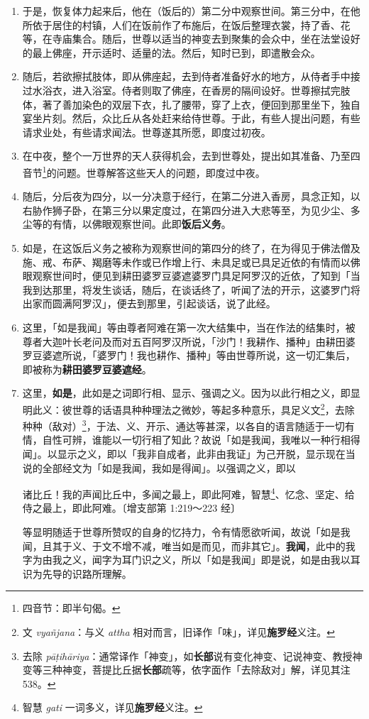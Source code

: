 \begin{enumerate}
\item 于是，恢复体力起来后，他在（饭后的）第二分中观察世间。第三分中，在他所依于居住的村镇，人们在饭前作了布施后，在饭后整理衣裳，持了香、花等，在寺庙集合。随后，世尊以适当的神变去到聚集的会众中，坐在法堂设好的最上佛座，开示适时、适量的法。然后，知时已到，即遣散会众。
\item 随后，若欲擦拭肢体，即从佛座起，去到侍者准备好水的地方，从侍者手中接过水浴衣，进入浴室。侍者则取了佛座，在香房的隔间设好。世尊擦拭完肢体，著了善加染色的双层下衣，扎了腰带，穿了上衣，便回到那里坐下，独自宴坐片刻。然后，众比丘从各处赶来给侍世尊。于此，有些人提出问题，有些请求业处，有些请求闻法。世尊遂其所愿，即度过初夜。
\item 在中夜，整个一万世界的天人获得机会，去到世尊处，提出如其准备、乃至四音节\footnote{四音节：即半句偈。}的问题。世尊解答这些天人的问题，即度过中夜。
\item 随后，分后夜为四分，以一分决意于经行，在第二分进入香房，具念正知，以右胁作狮子卧，在第三分以果定度过，在第四分进入大悲等至，为见少尘、多尘等的有情，以佛眼观察世间。此即\textbf{饭后义务}。
\item 如是，在这饭后义务之被称为观察世间的第四分的终了，在为得见于佛法僧及施、戒、布萨、羯磨等未作或已作增上行、未具足或已具足近依的有情而以佛眼观察世间时，便见到耕田婆罗豆婆遮婆罗门具足阿罗汉的近依，了知到「当我到达那里，将发生谈话，随后，在谈话终了，听闻了法的开示，这婆罗门将出家而圆满阿罗汉」，便去到那里，引起谈话，说了此经。
\item 这里，「如是我闻」等由尊者阿难在第一次大结集中，当在作法的结集时，被尊者大迦叶长老问及而对五百阿罗汉所说，「沙门！我耕作、播种」由耕田婆罗豆婆遮所说，「婆罗门！我也耕作、播种」等由世尊所说，这一切汇集后，即被称为\textbf{耕田婆罗豆婆遮经}。
\item 这里，\textbf{如是}，此如是之词即行相、显示、强调之义。因为以此行相之义，即显明此义：彼世尊的话语具种种理法之微妙，等起多种意乐，具足义文\footnote{文 \textit{vyañjana}：与义 \textit{attha} 相对而言，旧译作「味」，详见\textbf{施罗经}义注。}，去除种种（敌对）\footnote{去除 \textit{pāṭihāriya}：通常译作「神变」，如\textbf{长部}说有变化神变、记说神变、教授神变等三种神变，菩提比丘据\textbf{长部}疏等，依字面作「去除敌对」解，详见其注 538。}，于法、义、开示、通达等甚深，以各自的语言随适于一切有情，自性可辨，谁能以一切行相了知此？故说「如是我闻，我唯以一种行相得闻」。以显示之义，即以「我非自成者，此非由我证」为己开脱，显示现在当说的全部经文为「如是我闻，我如是得闻」。以强调之义，即以\begin{quoting}诸比丘！我的声闻比丘中，多闻之最上，即此阿难，智慧\footnote{智慧 \textit{gati} 一词多义，详见\textbf{施罗经}义注。}、忆念、坚定、给侍之最上，即此阿难。{\bluefootnotesize 〔增支部第 1:219～223 经〕}\end{quoting}等显明随适于世尊所赞叹的自身的忆持力，令有情愿欲听闻，故说「如是我闻，且其于义、于文不增不减，唯当如是而见，而非其它」。\textbf{我闻}，此中的我字为由我之义，闻字为耳门识之义，所以「如是我闻」即是说，如是由我以耳识为先导的识路所理解。

\end{enumerate}
